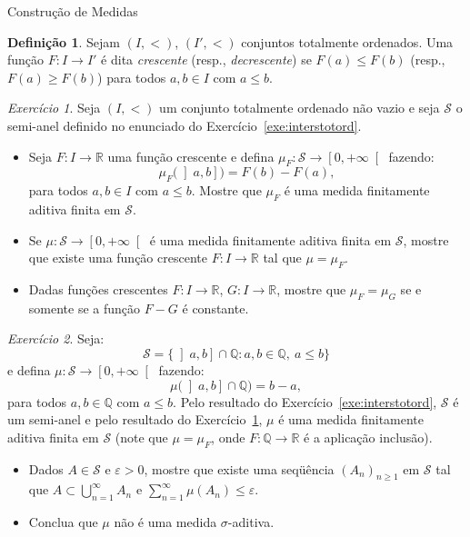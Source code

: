 \documentclass[oneside,final,11pt]{amsbook}
\newcommand{\R}{\mathds R}
\newcommand{\Q}{\mathds Q}
\theoremstyle{remark}\newtheorem{exercise}{Exercício}[chapter]
\theoremstyle{remark}\newtheorem{*exercise}[exercise]{\hbox to 0pt{\hskip 0pt minus 1fil*}Exercício}
\theoremstyle{definition}\newtheorem{exdefin}{Definição}[chapter]
\theoremstyle{plain}\newtheorem{teo}{Teorema}[section]
\theoremstyle{plain}\newtheorem{lem}[teo]{Lema}
\theoremstyle{plain}\newtheorem{prop}[teo]{Proposição}
\theoremstyle{plain}\newtheorem{cor}[teo]{Corolário}
\theoremstyle{definition}\newtheorem{defin}[teo]{Definição}
\theoremstyle{remark}\newtheorem{rem}[teo]{Observação}
\theoremstyle{definition}\newtheorem{notation}[teo]{Notação}
\theoremstyle{definition}\newtheorem{convention}[teo]{Convenção}
\theoremstyle{definition}\newtheorem{example}[teo]{Exemplo}
\numberwithin{section}{chapter}
\numberwithin{equation}{section}
\begin{document}
\begin{chapter}{Construção de Medidas}
\begin{exdefin}
Sejam $(I,<)$, $(I',<)$ conjuntos totalmente ordenados. Uma função $F:I\to I'$ é dita
{\em crescente\/} (resp.,
{\em decrescente}) se
$F(a)\le F(b)$ (resp., $F(a)\ge F(b)$) para todos $a,b\in I$ com $a\le b$.
\end{exdefin}

\begin{exercise}\label{exe:muFtotord}
Seja $(I,<)$ um conjunto totalmente ordenado não vazio e seja $\mathcal S$ o semi-anel definido
no enunciado do Exercício~\ref{exe:interstotord}.
\begin{itemize}
\item[(a)] Seja $F:I\to\R$ uma função crescente e defina $\mu_F:\mathcal S\to\left[0,+\infty\right[$
fazendo:
\[\mu_F\big(\left]a,b\right]\big)=F(b)-F(a),\]
para todos $a,b\in I$ com $a\le b$. Mostre que $\mu_F$ é uma medida finitamente aditiva finita em $\mathcal S$.
\item[(b)] Se $\mu:\mathcal S\to\left[0,+\infty\right[$ é uma medida finitamente aditiva
finita em $\mathcal S$, mostre que existe uma função crescente $F:I\to\R$ tal que
$\mu=\mu_F$.
\item[(c)] Dadas funções crescentes $F:I\to\R$, $G:I\to\R$, mostre que $\mu_F=\mu_G$
se e somente se a função $F-G$ é constante.
\end{itemize}
\end{exercise}

\begin{exercise}\label{exe:poiseh}
Seja:
\[\mathcal S=\big\{\left]a,b\right]\cap\Q:a,b\in\Q,\ a\le b\big\}\]
e defina $\mu:\mathcal S\to\left[0,+\infty\right[$ fazendo:
\[\mu\big(\left]a,b\right]\cap\Q\big)=b-a,\]
para todos $a,b\in\Q$ com $a\le b$. Pelo resultado do Exercício~\ref{exe:interstotord},
$\mathcal S$ é um semi-anel e pelo resultado do Exercício~\ref{exe:muFtotord},
$\mu$ é uma medida finitamente aditiva finita em $\mathcal S$ (note que
$\mu=\mu_F$, onde $F:\Q\to\R$ é a aplicação inclusão).
\begin{itemize}
\item[(a)] Dados $A\in\mathcal S$ e $\varepsilon>0$, mostre que existe uma seqüência $(A_n)_{n\ge1}$
em $\mathcal S$ tal que $A\subset\bigcup_{n=1}^\infty A_n$ e $\sum_{n=1}^\infty\mu(A_n)\le\varepsilon$.
\item[(b)] Conclua que $\mu$ não é uma medida $\sigma$-aditiva.
\end{itemize}
\end{exercise}


\end{chapter}
\end{document}
